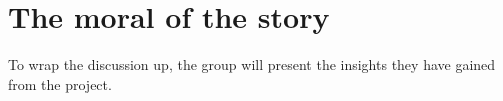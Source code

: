 \section{The moral of the story}\label{sec:moral-of-the-story}
To wrap the discussion up, the group will present the insights they have gained from the project. 















